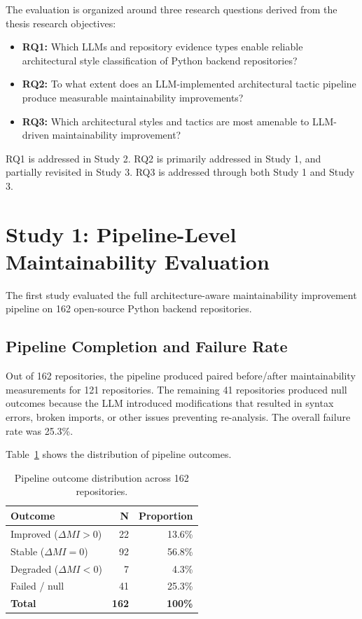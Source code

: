 The evaluation is organized around three research questions derived from the thesis research objectives:

\begin{itemize}
    \item \textbf{RQ1:} Which LLMs and repository evidence types enable reliable architectural style classification of Python backend repositories?
    \item \textbf{RQ2:} To what extent does an LLM-implemented architectural tactic pipeline produce measurable maintainability improvements?
    \item \textbf{RQ3:} Which architectural styles and tactics are most amenable to LLM-driven maintainability improvement?
\end{itemize}

RQ1 is addressed in Study 2. RQ2 is primarily addressed in Study 1, and partially revisited in Study 3. RQ3 is addressed through both Study 1 and Study 3.

\section{Study 1: Pipeline-Level Maintainability Evaluation}
\label{sec:eval_pipeline}

The first study evaluated the full architecture-aware maintainability improvement pipeline on 162 open-source Python backend repositories.

\subsection{Pipeline Completion and Failure Rate}
\label{subsec:eval_pipeline_completion}

Out of 162 repositories, the pipeline produced paired before/after maintainability measurements for 121 repositories. The remaining 41 repositories produced null outcomes because the LLM introduced modifications that resulted in syntax errors, broken imports, or other issues preventing re-analysis. The overall failure rate was 25.3\%.

Table~\ref{tab:eval_outcomes} shows the distribution of pipeline outcomes.

\begin{table}[H]
\centering
\small
\caption{Pipeline outcome distribution across 162 repositories.}
\label{tab:eval_outcomes}
\begin{tabular}{lrr}
\toprule
\textbf{Outcome} & \textbf{N} & \textbf{Proportion} \\
\midrule
Improved ($\Delta MI > 0$) & 22 & 13.6\% \\
Stable ($\Delta MI = 0$) & 92 & 56.8\% \\
Degraded ($\Delta MI < 0$) & 7 & 4.3\% \\
Failed / null & 41 & 25.3\% \\
\midrule
\textbf{Total} & \textbf{162} & \textbf{100\%} \\
\bottomrule
\end{tabular}
\end{table}

